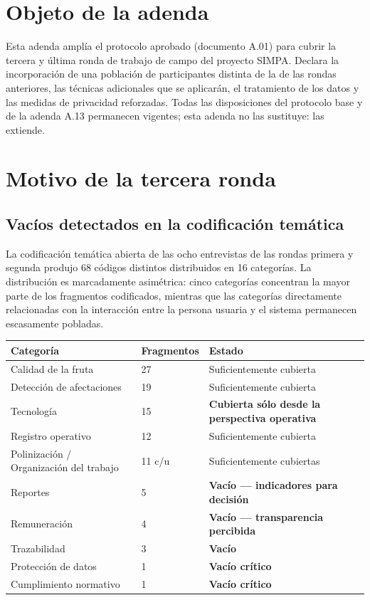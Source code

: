 \documentclass[11pt,a4paper]{article}
\begin{document}
\section{Objeto de la adenda}

Esta adenda amplía el protocolo aprobado (documento A.01) para cubrir la tercera y última ronda de trabajo
de campo del proyecto SIMPA. Declara la incorporación de una población de participantes distinta de la de
las rondas anteriores, las técnicas adicionales que se aplicarán, el tratamiento de los datos y las medidas
de privacidad reforzadas. Todas las disposiciones del protocolo base y de la adenda A.13 permanecen
vigentes; esta adenda no las sustituye: las extiende.

\section{Motivo de la tercera ronda}

\subsection{Vacíos detectados en la codificación temática}

La codificación temática abierta de las ocho entrevistas de las rondas primera y segunda produjo 68 códigos
distintos distribuidos en 16 categorías. La distribución es marcadamente asimétrica: cinco categorías
concentran la mayor parte de los fragmentos codificados, mientras que las categorías directamente
relacionadas con la interacción entre la persona usuaria y el sistema permanecen escasamente pobladas.

\renewcommand{\arraystretch}{1.2}
\begin{longtable}{|L{5.2cm}|C{2.4cm}|L{7.4cm}|}
\hline
{}\textbf{Categoría} & \textbf{Fragmentos} & \textbf{Estado} \\
\hline
Calidad de la fruta & 27 & Suficientemente cubierta \\
\hline
Detección de afectaciones & 19 & Suficientemente cubierta \\
\hline
Tecnología & 15 & \textbf{Cubierta sólo desde la perspectiva operativa} \\
\hline
Registro operativo & 12 & Suficientemente cubierta \\
\hline
Polinización / Organización del trabajo & 11 c/u & Suficientemente cubiertas \\
\hline
Reportes & 5 & \textbf{Vacío --- indicadores para decisión} \\
\hline
Remuneración & 4 & \textbf{Vacío --- transparencia percibida} \\
\hline
Trazabilidad & 3 & \textbf{Vacío} \\
\hline
Protección de datos & 1 & \textbf{Vacío crítico} \\
\hline
Cumplimiento normativo & 1 & \textbf{Vacío crítico} \\
\hline
\end{longtable}
\end{document}
